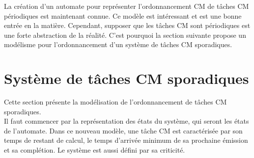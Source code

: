 \documentclass[12pt,a4paper,oneside]{book}
\theoremstyle{break}
\theoremstyle{breakplain}
\begin{document}
La création d'un automate pour représenter l'ordonnancement CM de tâches CM périodiques est maintenant connue. Ce modèle est intéressant et est une bonne entrée en la matière. Cependant, supposer que les tâches CM sont périodiques est une forte abstraction de la réalité. C'est pourquoi la section suivante propose un modélisme pour l'ordonnancement d'un système de tâches CM sporadiques.

\section{Système de tâches CM sporadiques}
Cette section présente la modélisation de l'ordonnancement de tâches CM sporadiques.\\

Il faut commencer par la représentation des états du système, qui seront les états de l'automate. Dans ce nouveau modèle, une tâche CM est caractérisée par son temps de restant de calcul, le temps d'arrivée minimum de sa prochaine émission et sa complétion. Le système est aussi défini par sa criticité.\\
\end{document}
